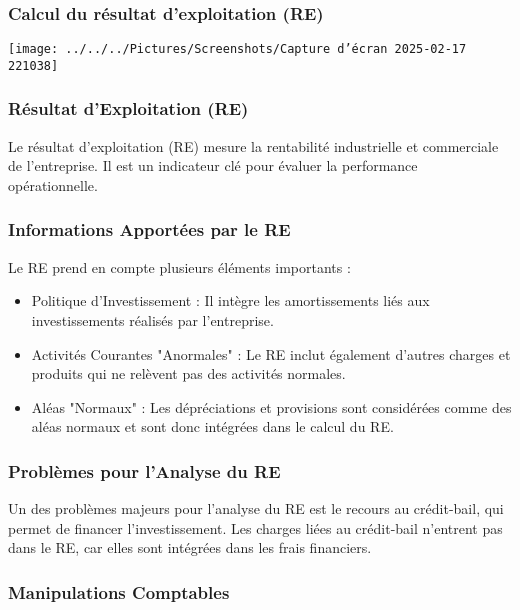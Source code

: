 \documentclass[a4paper, 12pt]{report}
\begin{document}
\subsubsection{Calcul du résultat d'exploitation (RE)}

\begin{center}
	\texttt{[image: ../../../Pictures/Screenshots/Capture d'écran 2025-02-17 221038]}
\end{center}

\subsubsection{Résultat d'Exploitation (RE)}

Le résultat d'exploitation (RE) mesure la rentabilité industrielle et commerciale de l'entreprise. Il est un indicateur clé pour évaluer la performance opérationnelle.

\subsubsection{Informations Apportées par le RE}

Le RE prend en compte plusieurs éléments importants :

\begin{itemize}
	\item Politique d'Investissement : Il intègre les amortissements liés aux investissements réalisés par l'entreprise.
	\item Activités Courantes "Anormales" : Le RE inclut également d'autres charges et produits qui ne relèvent pas des activités normales.
	\item Aléas "Normaux" : Les dépréciations et provisions sont considérées comme des aléas normaux et sont donc intégrées dans le calcul du RE.
\end{itemize}

\subsubsection{Problèmes pour l'Analyse du RE}

Un des problèmes majeurs pour l'analyse du RE est le recours au crédit-bail, qui permet de financer l'investissement. Les charges liées au crédit-bail n'entrent pas dans le RE, car elles sont intégrées dans les frais financiers.

\subsubsection{Manipulations Comptables}
\end{document}
